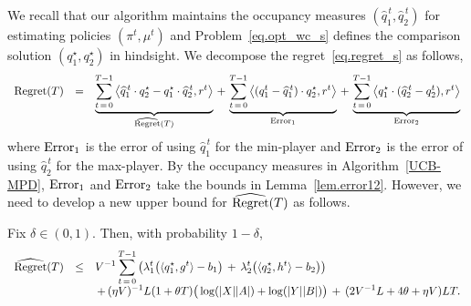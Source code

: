 \documentclass[12pt, final]{l4dc2023}
\begin{document}
We recall that our algorithm maintains the occupancy measures $(\hat q_1^{\,t}, \hat q_2^{\,t})$ for estimating policies $(\pi^t,\mu^t)$ and Problem~\eqref{eq.opt_wc_s} defines the comparison solution $(q_1^\star,q_2^\star)$ in hindsight. We decompose the regret~\eqref{eq.regret_s} as follows,
\[
\begin{array}{rcl}
\text{Regret}(T) 
&=&\displaystyle 
\underbrace{
	\sum_{t\,=\,0}^{T-1} \big\langle{ \hat q_1^{\,t}\cdot  q_2^\star- q_1^\star\cdot \hat q_2^{\,t} },{r^{t}}\big\rangle 
}_{\hat{\text{\normalfont Regret}}(T)}
\,+\,
\underbrace{
	\sum_{t\,=\,0}^{T-1} \inner{( q_1^t-\hat q_1^{\,t}) \cdot q_2^\star}{r^t} 
}_{\text{\normalfont Error}_1}
\,+\,
\underbrace{
	\sum_{t\,=\,0}^{T-1} \inner{q_1^\star \cdot (\hat q_2^{\,t}-q_2^t)}{r^t} 
}_{\text{\normalfont Error}_2}
\end{array}
\]
where ${\text{\normalfont Error}_1}$ is the error of using $\hat q_1^{\,t}$ for the min-player and ${\text{\normalfont Error}_2}$ is the error of using $\hat q_2^{\,t}$ for the max-player. By the occupancy measures in Algorithm~\ref{UCB-MPD}, ${\text{\normalfont Error}_1}$ and ${\text{\normalfont Error}_2}$ take the bounds in Lemma~\ref{lem.error12}. However, we need to develop a new upper bound for ${\hat{\text{\normalfont Regret}}(T)}$ as follows. 
\begin{lemma}\label{lem.gap_pd_s}
	Fix $\delta\in (0,1)$. Then, with probability $1-\delta$,
	\[
	\begin{array}{rcl}
	\displaystyle
	{\hat{\text{\normalfont Regret}}(T)}
	&\leq& \displaystyle V^{-1}
	\sum_{t\,=\,0}^{T-1} 
	\left(
	\lambda_1^{t} \big(\langle{ q_1^\star},{g^{t}}\rangle 
	-b_1\big)
	\,+\,
	\lambda_2^{t} \big(\langle{ q_2^\star},{h^{t}}\rangle -b_2\big)
	\right)
	\\[0.2cm]
	&&\displaystyle 
	\,+\, (\eta V)^{-1} L (1+\theta T)\big(\log (|X||A|) +\log (|Y||B|)\big)
	\,+\,(2 V^{-1}L+4\theta +\eta V) LT.
	\end{array}
	\]
\end{lemma}
\end{document}
